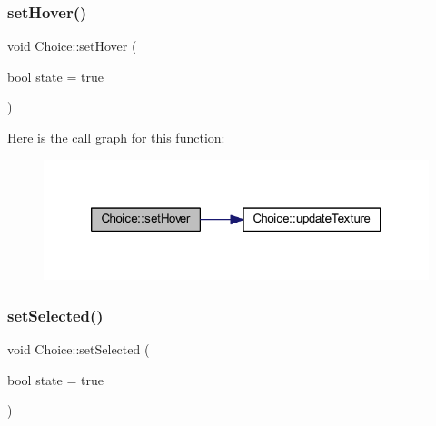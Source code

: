 \subsubsection{\texorpdfstring{set\+Hover()}{setHover()}}
{\footnotesize\ttfamily void Choice\+::set\+Hover (\begin{DoxyParamCaption}\item[{bool}]{state = {\ttfamily true} }\end{DoxyParamCaption})}

Here is the call graph for this function\+:
\nopagebreak
\begin{figure}[H]
\begin{center}
\leavevmode
\includegraphics[width=320pt]{class_choice_a377e5d456c5c7c7e8914af52cf184a3a_cgraph}
\end{center}
\end{figure}
\mbox{\label{class_choice_aa4bbe520ca9f933327fc1f678d6626f8}} 
\subsubsection{\texorpdfstring{set\+Selected()}{setSelected()}}
{\footnotesize\ttfamily void Choice\+::set\+Selected (\begin{DoxyParamCaption}\item[{bool}]{state = {\ttfamily true} }\end{DoxyParamCaption})}

